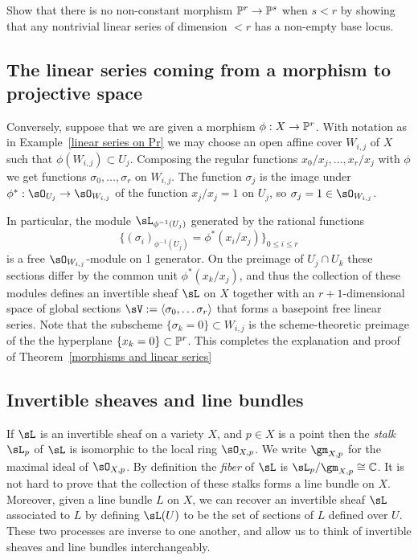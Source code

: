 \begin{exercise}\label{here there be basepoints}
 Show that there is no non-constant morphism $\PP^r\to \PP^s$ when $s<r$ by showing that any nontrivial linear
 series of dimension $<r$ has a non-empty base locus.
\end{exercise}

\subsection{The linear series coming from a morphism to projective space}

Conversely, suppose that we are given a morphism $\phi: X\to \PP^{r}$. With notation as in Example~\ref{linear series on Pr} we may choose an open affine cover $W_{i,j}$ of $X$ such that $\phi(W_{i,j})\subset U_{j}$. Composing the regular
functions
$x_{0}/x_{j},\dots, x_{r}/x_{j}$ with $\phi$ we get functions $\sigma_{0},\dots,\sigma_{r}$ on $W_{i,j}$.  The function $\sigma_{j}$ is the image under $\phi^*: \sO_{U_j} \to \sO_{W_{i,j}}$ of the function $x_j/x_j = 1$ on $U_{j}$, so $\sigma_j = 1\in \sO_{W_{i,j}}$. 

In particular, the module $\sL_{\phi^{-1}(U_j)}$ generated by the rational functions 
$$
\{(\sigma_i)_{\phi^{-1}(U_j)} = \phi^*(x_i/x_j)\}_{0\leq i\leq r}
$$
 is a free $\sO_{W_{i,j}}$-module on 1 generator. On the preimage of $U_j\cap U_k$ these sections differ by the common unit $\phi^*(x_k/x_j)$, and thus the collection of these modules defines an invertible sheaf $\sL$ on $X$ together with an
$r+1$-dimensional space of global sections $\sV := \langle \sigma_0,\dots \sigma_r\rangle$ that forms a basepoint free linear series. Note that the subscheme  $\{\sigma_k = 0\} \subset W_{i,j}$  is the scheme-theoretic preimage of the
the hyperplane $\{x_k = 0\}\subset \PP^r$. This completes the explanation and proof of Theorem~\ref{morphisms and linear series}

\subsection{Invertible sheaves and line bundles}

If $\sL$ is an invertible sheaf on a variety $X$, and $p\in X$ is a point then the \emph{stalk} $\sL_p$ of $\sL$ is isomorphic to the local
ring $\sO_{X,p}$. We write $\gm_{X,p}$ for the maximal ideal of $\sO_{X,p}$. By definition the \emph{fiber} of $\sL$ is 
$\sL_p/\gm_{X,p}\cong \CC$. It is not hard to prove that the collection of these stalks forms a line bundle on $X$. Moreover,
given a line bundle $L$ on $X$, we can recover an invertible sheaf $\sL$ associated to $L$ by defining
$\sL(U)$ to be the set of sections of $L$ defined over $U$. These two processes are inverse to one another, and allow
us to think of invertible sheaves and line bundles interchangeably.


